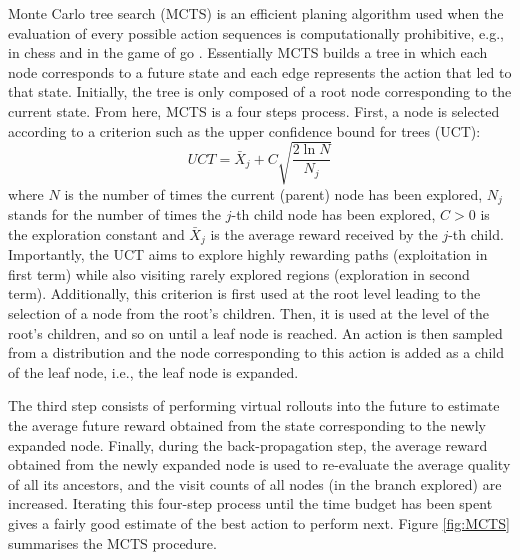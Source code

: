 \documentclass[11pt,fleqn]{book} %
\begin{document}
Monte Carlo tree search (MCTS) \cite{MCTS} is an efficient planing algorithm used when the evaluation of every possible action sequences is computationally prohibitive, e.g., in chess and in the game of go \cite{GO,MuZero}. Essentially MCTS builds a tree in which each node corresponds to a future state and each edge represents the action that led to that state. Initially, the tree is only composed of a root node corresponding to the current state. From here, MCTS is a four steps process. First, a node is selected according to a criterion such as the upper confidence bound for trees (UCT):
$$UCT = \bar{X}_j + C \sqrt{\frac{2 \ln N}{N_j}}$$
where $N$ is the number of times the current (parent) node has been explored, $N_j$ stands for the number of times the $j$-th child node has been explored, $C > 0$ is the exploration constant and $\bar{X}_j$ is the average reward received by the $j$-th child. Importantly, the UCT aims to explore highly rewarding paths (exploitation in first term) while also visiting rarely explored regions (exploration in second term). Additionally, this criterion is first used at the root level leading to the selection of a node from the root's children. Then, it is used at the level of the root's children, and so on until a leaf node is reached. An action is then sampled from a distribution and the node corresponding to this action is added as a child of the leaf node, i.e., the leaf node is expanded.

The third step consists of performing virtual rollouts into the future to estimate the average future reward obtained from the state corresponding to the newly expanded node. Finally, during the back-propagation step, the average reward obtained from the newly expanded node is used to re-evaluate the average quality of all its ancestors, and the visit counts of all nodes (in the branch explored) are increased. Iterating this four-step process until the time budget has been spent gives a fairly good estimate of the best action to perform next. Figure \ref{fig:MCTS} summarises the MCTS procedure.
\end{document}
